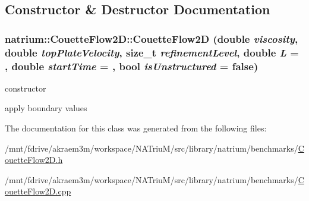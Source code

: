 \subsection{Constructor \& Destructor Documentation}
\hypertarget{classnatrium_1_1CouetteFlow2D_a94e51b7eaff3998383f1d7dc07b994cb}{
\subsubsection[{CouetteFlow2D}]{\setlength{\rightskip}{0pt plus 5cm}natrium::CouetteFlow2D::CouetteFlow2D (double {\em viscosity}, \/  double {\em topPlateVelocity}, \/  size\_\-t {\em refinementLevel}, \/  double {\em L} = {}, \/  double {\em startTime} = {}, \/  bool {\em isUnstructured} = {\ttfamily false})}}
\label{classnatrium_1_1CouetteFlow2D_a94e51b7eaff3998383f1d7dc07b994cb}


constructor 

apply boundary values 

The documentation for this class was generated from the following files:\begin{DoxyCompactItemize}
\item 
/mnt/fdrive/akraem3m/workspace/NATriuM/src/library/natrium/benchmarks/\hyperlink{CouetteFlow2D_8h}{CouetteFlow2D.h}\item 
/mnt/fdrive/akraem3m/workspace/NATriuM/src/library/natrium/benchmarks/\hyperlink{CouetteFlow2D_8cpp}{CouetteFlow2D.cpp}\end{DoxyCompactItemize}
